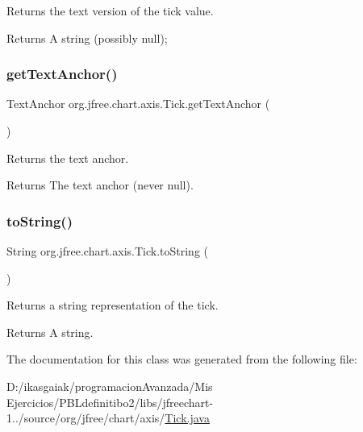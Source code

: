 Returns the text version of the tick value.

\begin{DoxyReturn}{Returns}
A string (possibly {\ttfamily null}); 
\end{DoxyReturn}
\mbox{\label{classorg_1_1jfree_1_1chart_1_1axis_1_1_tick_a2e7f5b8a1f91555793982ee870d89c84}} 
\subsubsection{\texorpdfstring{get\+Text\+Anchor()}{getTextAnchor()}}
{\footnotesize\ttfamily Text\+Anchor org.\+jfree.\+chart.\+axis.\+Tick.\+get\+Text\+Anchor (\begin{DoxyParamCaption}{ }\end{DoxyParamCaption})}

Returns the text anchor.

\begin{DoxyReturn}{Returns}
The text anchor (never {\ttfamily null}). 
\end{DoxyReturn}
\mbox{\label{classorg_1_1jfree_1_1chart_1_1axis_1_1_tick_a2c02890c3d1ff243df8a6f199dbde8a6}} 
\subsubsection{\texorpdfstring{to\+String()}{toString()}}
{\footnotesize\ttfamily String org.\+jfree.\+chart.\+axis.\+Tick.\+to\+String (\begin{DoxyParamCaption}{ }\end{DoxyParamCaption})}

Returns a string representation of the tick.

\begin{DoxyReturn}{Returns}
A string. 
\end{DoxyReturn}


The documentation for this class was generated from the following file\+:\begin{DoxyCompactItemize}
\item 
D\+:/ikasgaiak/programacion\+Avanzada/\+Mis Ejercicios/\+P\+B\+Ldefinitibo2/libs/jfreechart-\/1../source/org/jfree/chart/axis/\mbox{\hyperlink{_tick_8java}{Tick.\+java}}\end{DoxyCompactItemize}
